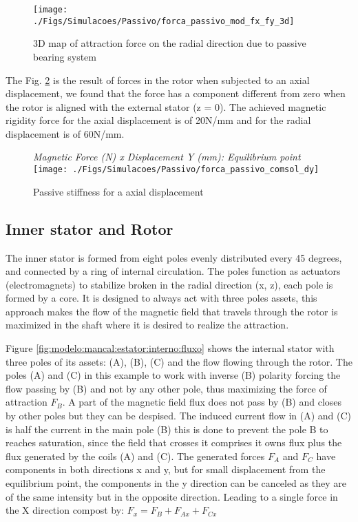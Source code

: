 \documentclass[10pt,fleqn,a4paper,twoside]{article}
\begin{document}
	\begin{figure}[th]
		\centering
		\texttt{[image: ./Figs/Simulacoes/Passivo/forca\_passivo\_mod\_fx\_fy\_3d]}
		\caption{3D map of attraction force on the radial direction due to passive bearing system}
		\label{fig:forca:passivo:mod:fx:fy:3d}
	\end{figure}
	
	The Fig. \ref{fig:forca:passivo:comsol:dy} is the result of forces in the rotor when subjected to an axial displacement, we found that the force has a component different from zero when the rotor is aligned with the external stator (z = 0). The achieved magnetic rigidity force for the axial displacement is of 20N/mm and for the radial displacement is of 60N/mm. 
	
	\begin{figure}[ht]
		\centering
		{\textit{Magnetic Force (N) x Displacement Y (mm): Equilibrium point}}\\
		\texttt{[image: ./Figs/Simulacoes/Passivo/forca\_passivo\_comsol\_dy]}
		\caption{Passive stiffness for a axial displacement }
		\label{fig:forca:passivo:comsol:dy}
	\end{figure}
	
	\subsection{Inner stator and Rotor}
	
	The inner stator is formed from eight poles evenly distributed every 45 degrees, and connected by a ring of internal circulation. The poles function as actuators (electromagnets) to stabilize broken in the radial direction (x, z), each pole is formed by a core.  It is designed to always act with three poles assets, this approach makes the flow of the magnetic field that travels through the rotor is maximized in the shaft where it is desired to realize the attraction.
	
	Figure \ref{fig:modelo:mancal:estator:interno:fluxo} shows the internal stator with three poles of its assets: (A), (B), (C) and the flow flowing through the rotor. The poles (A) and (C) in this example to work with inverse (B) polarity forcing the flow passing by (B) and not by any other pole, thus maximizing the force of attraction $F_B$. A part of the magnetic field flux does not pass by (B) and closes by other poles but they can be despised. The induced current flow in (A) and (C) is half the current in the main pole (B) this is done to prevent the pole B to reaches saturation, since the field that crosses it comprises it owns flux plus the flux generated by the coils (A) and (C). The generated forces $F_A$ and $F_C$  have components in both directions x and y, but for small displacement from the equilibrium point, the components in the y direction can be canceled as they are of the same intensity but in the opposite direction. Leading to a single force in the X direction compost by: $F_x = F_B + F_{Ax} + F_{Cx}$
	
\end{document}
